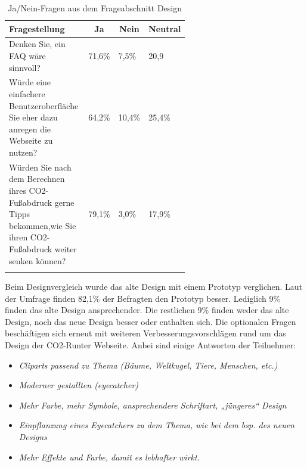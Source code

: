 \begin{longtable}{|p{0.6\linewidth}|l|l|l|}
    \hline
    \multicolumn{1}{|l|}{\textbf{Fragestellung}}                                                                                                                      &
    \multicolumn{1}{c|}{\textbf{Ja}}                                                                                                                                  &
    \multicolumn{1}{c|}{\textbf{Nein}}                                                                                                                                &
    \multicolumn{1}{r|}{\textbf{Neutral}}                                                                                                                                                        \\ \hline
    \endfirsthead

    Denken Sie, ein FAQ wäre sinnvoll?                                                                                                                                & 71,6\% & 7,5\%  & 20,9   \\ \hline
    Würde eine einfachere Benutzeroberfläche Sie eher                    dazu anregen die Webseite zu nutzen?                                                         & 64,2\% & 10,4\% & 25,4\% \\ \hline
    Würden Sie nach dem Berechnen                                        ihres CO2-Fußabdruck gerne Tipps bekommen,wie Sie ihren CO2-Fußabdruck weiter senken können? & 79,1\% & 3,0\%  & 17,9\% \\ \hline
    \caption{Ja/Nein-Fragen aus dem Frageabschnitt Design}
    \label{designFragen}
    \\
\end{longtable}

Beim Designvergleich wurde das alte Design mit einem Prototyp verglichen.
Laut der Umfrage finden 82,1\% der Befragten den Prototyp besser.
Lediglich 9\% finden das alte Design ansprechender.
Die restlichen 9\% finden weder das alte Design, noch das neue Design besser oder enthalten sich.
Die optionalen Fragen beschäftigen sich erneut mit weiteren Verbesserungsvorschlägen rund um das Design der CO2-Runter Webseite.
Anbei sind einige Antworten der Teilnehmer:

\begin{itemize}
    \item \textit{Cliparts passend zu Thema (Bäume, Weltkugel, Tiere, Menschen, etc.)}
    \item \textit{Moderner gestallten (eyecatcher)}
    \item \textit{Mehr Farbe, mehr Symbole, ansprechendere Schriftart, „jüngeres“ Design}
    \item \textit{Einpflanzung eines Eyecatchers zu dem Thema, wie bei dem bsp. des neuen Designs }
    \item \textit{Mehr Effekte und Farbe, damit es lebhafter wirkt.}
\end{itemize}

